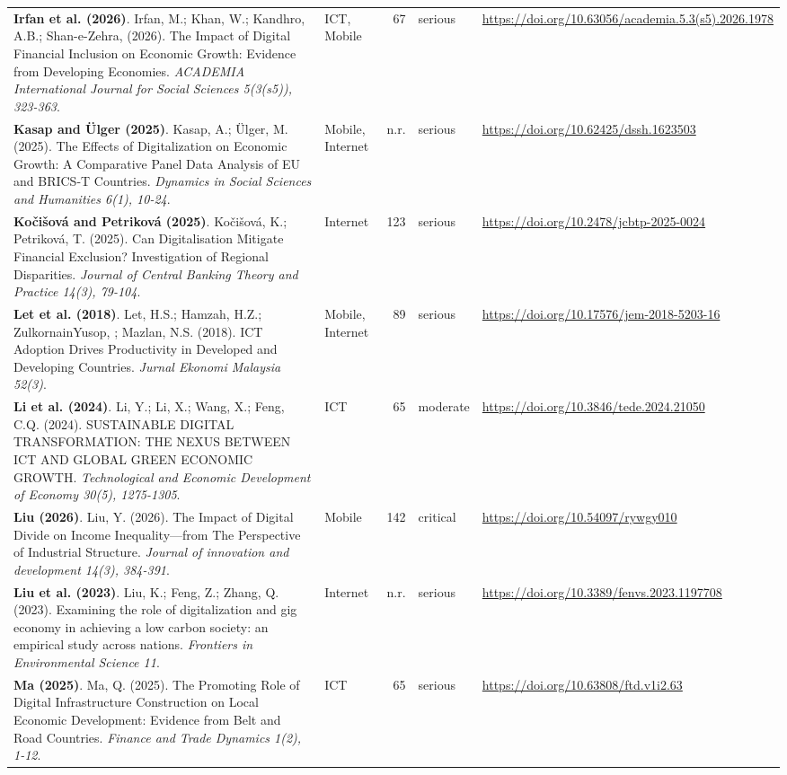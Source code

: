 {\begin{longtable}{@{}p{7.4cm} p{1.3cm} r l p{3.4cm}@{}}
\textbf{Irfan et al. (2026)}. Irfan, M.; Khan, W.; Kandhro, A.B.; Shan-e-Zehra,  (2026). The Impact of Digital Financial Inclusion on Economic Growth: Evidence from Developing Economies. \emph{ACADEMIA International Journal for Social Sciences 5(3(s5)), 323-363}. & ICT, Mobile & 67 & serious & \url{https://doi.org/10.63056/academia.5.3(s5).2026.1978} \\
\textbf{Kasap and Ülger (2025)}. Kasap, A.; Ülger, M. (2025). The Effects of Digitalization on Economic Growth: A Comparative Panel Data Analysis of EU and BRICS-T Countries. \emph{Dynamics in Social Sciences and Humanities 6(1), 10-24}. & Mobile, Internet & n.r. & serious & \url{https://doi.org/10.62425/dssh.1623503} \\
\textbf{Kočišová and Petriková (2025)}. Kočišová, K.; Petriková, T. (2025). Can Digitalisation Mitigate Financial Exclusion? Investigation of Regional Disparities. \emph{Journal of Central Banking Theory and Practice 14(3), 79-104}. & Internet & 123 & serious & \url{https://doi.org/10.2478/jcbtp-2025-0024} \\
\textbf{Let et al. (2018)}. Let, H.S.; Hamzah, H.Z.; ZulkornainYusop, ; Mazlan, N.S. (2018). ICT Adoption Drives Productivity in Developed and Developing Countries. \emph{Jurnal Ekonomi Malaysia 52(3)}. & Mobile, Internet & 89 & serious & \url{https://doi.org/10.17576/jem-2018-5203-16} \\
\textbf{Li et al. (2024)}. Li, Y.; Li, X.; Wang, X.; Feng, C.Q. (2024). SUSTAINABLE DIGITAL TRANSFORMATION: THE NEXUS BETWEEN ICT AND GLOBAL GREEN ECONOMIC GROWTH. \emph{Technological and Economic Development of Economy 30(5), 1275-1305}. & ICT & 65 & moderate & \url{https://doi.org/10.3846/tede.2024.21050} \\
\textbf{Liu (2026)}. Liu, Y. (2026). The Impact of Digital Divide on Income Inequality—from The Perspective of Industrial Structure. \emph{Journal of innovation and development 14(3), 384-391}. & Mobile & 142 & critical & \url{https://doi.org/10.54097/rywgy010} \\
\textbf{Liu et al. (2023)}. Liu, K.; Feng, Z.; Zhang, Q. (2023). Examining the role of digitalization and gig economy in achieving a low carbon society: an empirical study across nations. \emph{Frontiers in Environmental Science 11}. & Internet & n.r. & serious & \url{https://doi.org/10.3389/fenvs.2023.1197708} \\
\textbf{Ma (2025)}. Ma, Q. (2025). The Promoting Role of Digital Infrastructure Construction on Local Economic Development: Evidence from Belt and Road Countries. \emph{Finance and Trade Dynamics 1(2), 1-12}. & ICT & 65 & serious & \url{https://doi.org/10.63808/ftd.v1i2.63} \\

\end{longtable}}
